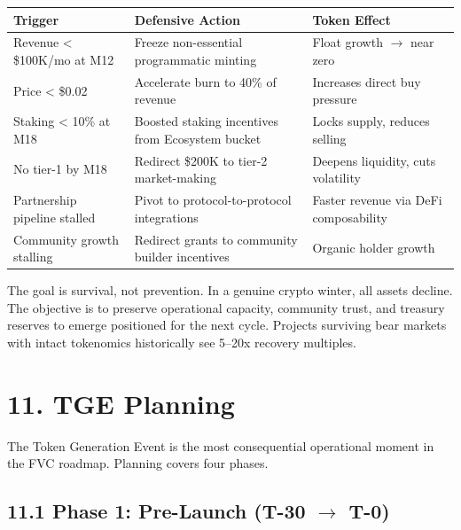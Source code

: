 \documentclass[
  paper=a4,
  ,captions=tableheading
]{scrartcl}
\begin{document}
\begin{center}
\small
\begin{tabularx}{\textwidth}{p{4.4cm} Y Y}
\toprule
\textbf{Trigger} & \textbf{Defensive Action} & \textbf{Token Effect} \\
\midrule
Revenue < \$100K/mo at M12 & Freeze non-essential programmatic minting & Float growth $\rightarrow$ near zero \\
Price < \$0.02 & Accelerate burn to 40\% of revenue & Increases direct buy pressure \\
Staking < 10\% at M18 & Boosted staking incentives from Ecosystem bucket & Locks supply, reduces selling \\
No tier-1 by M18 & Redirect \$200K to tier-2 market-making & Deepens liquidity, cuts volatility \\
Partnership pipeline stalled & Pivot to protocol-to-protocol integrations & Faster revenue via DeFi composability \\
Community growth stalling & Redirect grants to community builder incentives & Organic holder growth \\
\bottomrule
\end{tabularx}
\end{center}

The goal is survival, not prevention. In a genuine crypto winter, all assets decline. The objective is to preserve operational capacity, community trust, and treasury reserves to emerge positioned for the next cycle. Projects surviving bear markets with intact tokenomics historically see 5--20x recovery multiples.

\section{11. TGE Planning}\label{tge-planning}

The Token Generation Event is the most consequential operational moment in the FVC roadmap. Planning covers four phases.

\subsection{11.1 Phase 1: Pre-Launch (T-30 $\rightarrow$ T-0)}\label{tge-phase-1}
\end{document}

